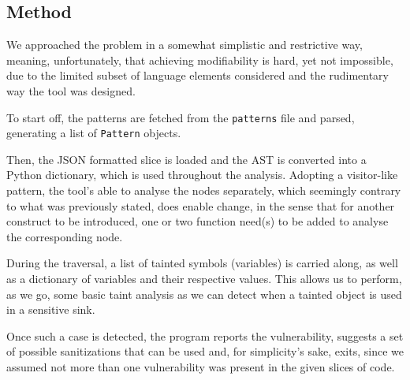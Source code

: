 \subsection*{Method}
\label{sec:experimental.method}

We approached the problem in a somewhat simplistic and restrictive way, meaning,
unfortunately, that achieving modifiability is hard, yet not impossible, due to
the limited subset of language elements considered and the rudimentary way the
tool was designed.

To start off, the patterns are fetched from the \verb|patterns| file and parsed,
generating a list of \verb|Pattern| objects.

Then, the JSON formatted slice is loaded and the AST is converted into a Python
dictionary, which is used throughout the analysis. Adopting a visitor-like
pattern, the tool's able to analyse the nodes separately, which seemingly
contrary to what was previously stated, does enable change, in the sense that
for another construct to be introduced, one or two function need(s) to be added
to analyse the corresponding node.

During the traversal, a list of tainted symbols (variables) is carried along, as
well as a dictionary of variables and their respective values. This allows us to
perform, as we go, some basic taint analysis as we can detect when a tainted
object is used in a sensitive sink.

Once such a case is detected, the program reports the vulnerability, suggests
a set of possible sanitizations that can be used and, for simplicity's sake,
exits, since we assumed not more than one vulnerability was present in the given
slices of code.

